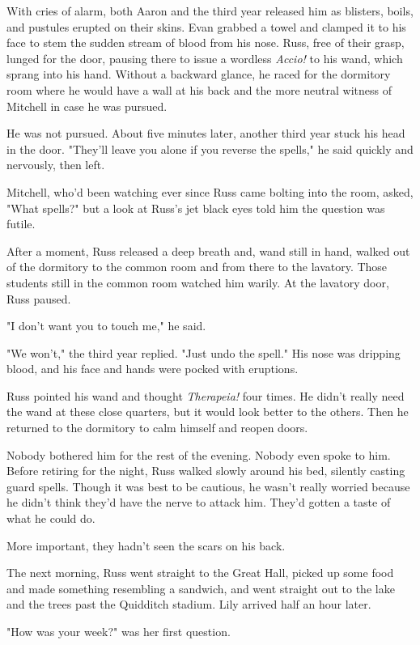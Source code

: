With cries of alarm, both Aaron and the third year released him as blisters, boils, and pustules erupted on their skins. Evan grabbed a towel and clamped it to his face to stem the sudden stream of blood from his nose. Russ, free of their grasp, lunged for the door, pausing there to issue a wordless \emph{Accio!} to his wand, which sprang into his hand. Without a backward glance, he raced for the dormitory room where he would have a wall at his back and the more neutral witness of Mitchell in case he was pursued.

He was not pursued. About five minutes later, another third year stuck his head in the door. "They'll leave you alone if you reverse the spells," he said quickly and nervously, then left.

Mitchell, who'd been watching ever since Russ came bolting into the room, asked, "What spells?" but a look at Russ's jet black eyes told him the question was futile.

After a moment, Russ released a deep breath and, wand still in hand, walked out of the dormitory to the common room and from there to the lavatory. Those students still in the common room watched him warily. At the lavatory door, Russ paused.

"I don't want you to touch me," he said.

"We won't," the third year replied. "Just undo the spell." His nose was dripping blood, and his face and hands were pocked with eruptions.

Russ pointed his wand and thought \emph{Therapeia!} four times. He didn't really need the wand at these close quarters, but it would look better to the others. Then he returned to the dormitory to calm himself and reopen doors.

Nobody bothered him for the rest of the evening. Nobody even spoke to him. Before retiring for the night, Russ walked slowly around his bed, silently casting guard spells. Though it was best to be cautious, he wasn't really worried because he didn't think they'd have the nerve to attack him. They'd gotten a taste of what he could do.

More important, they hadn't seen the scars on his back.

The next morning, Russ went straight to the Great Hall, picked up some food and made something resembling a sandwich, and went straight out to the lake and the trees past the Quidditch stadium. Lily arrived half an hour later.

"How was your week?" was her first question.

